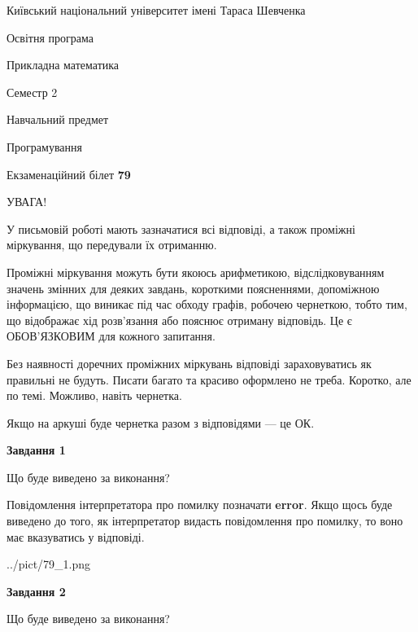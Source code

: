 \documentclass[12pt, ukrainian]{article}
\begin{document}
{{\begin {small}\par
{ \center  Київський національний університет імені Тараса Шевченка \par}
{\parbox {5 cm}{Освітня програма \hfill}{\parbox {7 cm}{Прикладна математика \hfill}}\parbox {6 cm}{\hfill Семестр 2}}\par
{\parbox {5 cm} {Навчальний предмет \hfill}\parbox {7 cm}{Програмування \hfill}\parbox {6cm}{\hfill}\par}\vspace{-7pt} \end{small}}{\center Екзаменаційний білет \No \textbf
{ 79 }\par}}
{
\begin {large}
УВАГА!

У письмовій роботі мають зазначатися всі відповіді, а також проміжні міркування, що передували їх отриманню.

Проміжні міркування можуть бути якоюсь арифметикою, відслідковуванням зна\-чень змінних для деяких завдань,
короткими поясненнями, допоміжною інформацією, що виникає під час обходу графів, робочею чернеткою,
тобто тим, що відображає хід розв’язання або пояснює отриману відповідь.
Це є ОБОВ’ЯЗКОВИМ для кожного запитання.

Без наявності доречних проміжних міркувань відповіді зараховуватись як правиль\-ні не будуть.
Писати багато та красиво оформлено не треба. Коротко, але по темі. Можли\-во, навіть чернетка.

Якщо на аркуші буде чернетка разом з відповідями --- це ОК.

\newpage

{\begin {center}\textbf{Завдання 1}\end {center}}\par
Що буде виведено за виконання?

Повідомлення інтерпретатора про помилку позначати \textbf{error}.
Якщо щось буде виведено до того, як інтерпретатор видасть повідомлення про помилку, 
то воно має вказуватись у відповіді. \par


\begin{center}
	{../pict/79_1.png}
\end{center}
\newpage

{\begin {center}\textbf{Завдання 2}\end {center}}\par
Що буде виведено за виконання?


\end{large}}
\end{document}
